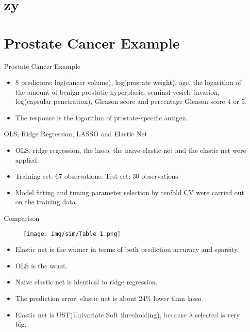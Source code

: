 \section{zy}

\section{Prostate Cancer Example}

    \begin{frame}{Prostate Cancer Example}
        \begin{itemize}
            \item 8 predictors: log(cancer volume), log(prostate weight), age, the logarithm of the amount of benign prostatic hyperplasia, seminal vesicle invasion, log(capsular penetration), Gleason score and percentage Gleason score 4 or 5.
            \item The response is the logarithm of prostate-specific antigen.
        \end{itemize}
        
    \end{frame}

    \begin{frame}{OLS, Ridge Regression, LASSO and Elastic Net}
        \begin{itemize}
            \item OLS, ridge regression, the lasso, the naive elastic net and the elastic net were applied.
            \item Training set: 67 observations; Test set: 30 observations.
            \item Model fitting and tuning parameter selection by tenfold CV were carried out on the training data.
        \end{itemize}
    \end{frame}

    \begin{frame}{Comparison}
        \begin{figure}
            \centering
            \texttt{[image: img/sim/Table 1.png]}
            \label{fig:enter-label}
        \end{figure}
        \begin{itemize}
            \item Elastic net is the winner in terms of both prediction accuracy and sparsity.
            \item OLS is the worst.
            \item Naive elastic net is identical to ridge regression.
            \item The prediction error: elastic net is about 24\% lower than lasso.
            \item Elastic net is UST(Univariate Soft thresholding), because $\lambda$ selected is very big.
        \end{itemize}
    \end{frame}
